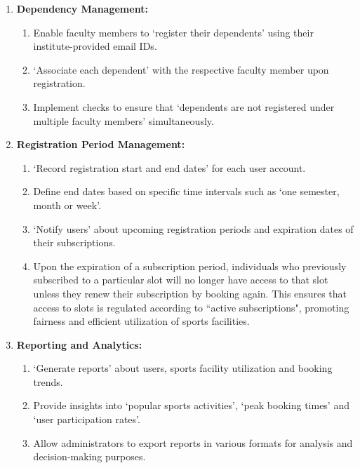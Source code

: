 \documentclass[12pt]{article}
\begin{document}
\begin{enumerate}[label=\arabic*.]
    \newpage

    \item \textbf{Dependency Management:}
    \begin{enumerate}[label=\alph*)]
        \item Enable faculty members to `register their dependents' using their institute-provided email IDs.
        \item `Associate each dependent' with the respective faculty member upon registration.
        \item Implement checks to ensure that `dependents are not registered under multiple faculty members' simultaneously.
    \end{enumerate}

    \vspace{0.4cm}

    \item \textbf{Registration Period Management:}
    \begin{enumerate}[label=\alph*)]
        \item `Record registration start and end dates' for each user account.
        \item Define end dates based on specific time intervals such as `one semester, month or week'.
        \item `Notify users' about upcoming registration periods and expiration dates of their subscriptions.
        \item Upon the expiration of a subscription period, individuals who previously subscribed to a particular slot will no longer have access to that slot unless they renew their subscription by booking again. This ensures that access to slots is regulated according to ``active subscriptions", promoting fairness and efficient utilization of sports facilities.
    \end{enumerate}

    \vspace{0.4cm}

    \item \textbf{Reporting and Analytics:}
    \begin{enumerate}[label=\alph*)]
        \item `Generate reports' about users, sports facility utilization and booking trends.
        \item Provide insights into `popular sports activities', `peak booking times' and `user participation rates'.
        \item Allow administrators to export reports in various formats for analysis and decision-making purposes.
    \end{enumerate}
   
\end{enumerate}
\end{document}
